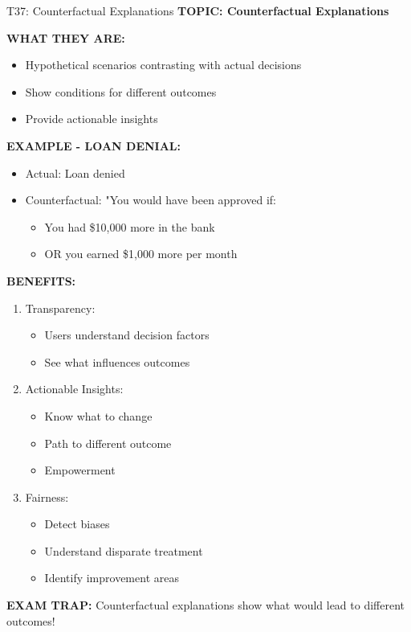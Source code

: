 \documentclass[8pt]{beamer}
\begin{document}
	\begin{frame}{T37: Counterfactual Explanations}
		\fontsize{6.5}{7.5}\selectfont
		\textbf{TOPIC: Counterfactual Explanations}
		
		\vspace{0.1cm}
		\textbf{WHAT THEY ARE:}
		\begin{itemize}
			\item Hypothetical scenarios contrasting with actual decisions
			\item Show conditions for different outcomes
			\item Provide actionable insights
		\end{itemize}
		
		\vspace{0.1cm}
		\textbf{EXAMPLE - LOAN DENIAL:}
		\begin{itemize}
			\item Actual: Loan denied
			\item Counterfactual: "You would have been approved if:
			\begin{itemize}
				\item You had \$10,000 more in the bank
				\item OR you earned \$1,000 more per month
			\end{itemize}
		\end{itemize}
		
		\vspace{0.1cm}
		\textbf{BENEFITS:}
		\begin{enumerate}
			\item \textcolor{myblue}{Transparency:}
			\begin{itemize}
				\item Users understand decision factors
				\item See what influences outcomes
			\end{itemize}
			\item \textcolor{myblue}{Actionable Insights:}
			\begin{itemize}
				\item Know what to change
				\item Path to different outcome
				\item Empowerment
			\end{itemize}
			\item \textcolor{myblue}{Fairness:}
			\begin{itemize}
				\item Detect biases
				\item Understand disparate treatment
				\item Identify improvement areas
			\end{itemize}
		\end{enumerate}
		
		\textcolor{myred}{\textbf{EXAM TRAP:}} Counterfactual explanations show \textcolor{myblue}{what would lead to different outcomes}!
	\end{frame}
	
\end{document}
